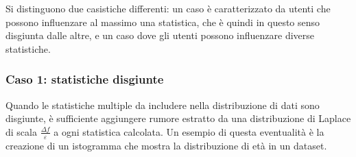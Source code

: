 Si distinguono due casistiche differenti: un caso è caratterizzato da utenti che possono influenzare al massimo una statistica, che è quindi in questo senso disgiunta dalle altre, e un caso dove gli utenti possono influenzare diverse statistiche.

\subsubsection{Caso 1: statistiche disgiunte}
Quando le statistiche multiple da includere nella distribuzione di dati sono disgiunte, è sufficiente aggiungere rumore estratto da una distribuzione di Laplace di scala $\frac{\Delta f}{\varepsilon}$ a ogni statistica calcolata. Un esempio di questa eventualità è la creazione di un istogramma che mostra la distribuzione di età in un dataset.

